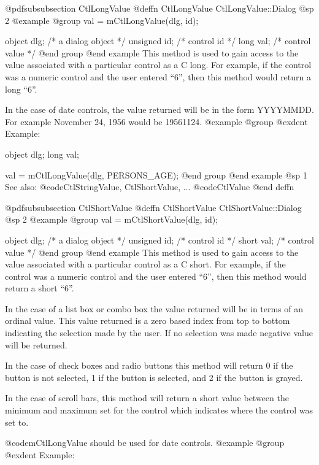 @pdfsubsubsection {CtlLongValue}
@deffn {CtlLongValue} CtlLongValue::Dialog
@sp 2
@example
@group
val = mCtlLongValue(dlg, id);

object  dlg;    /*  a dialog object  */
unsigned id;    /*  control id       */
long    val;    /*  control value    */
@end group
@end example
This method is used to gain access to the value associated with a
particular control as a C long.  For example, if the control
was a numeric control and the user entered ``6'', then this method
would return a long ``6''.

In the case of date controls, the value returned will be in the
form YYYYMMDD.  For example November 24, 1956 would be
19561124.
@example
@group
@exdent Example:

object  dlg;
long    val;

val = mCtlLongValue(dlg, PERSONS_AGE);
@end group
@end example
@sp 1
See also:  @code{CtlStringValue, CtlShortValue, ...}
        @code{CtlValue}
@end deffn














@pdfsubsubsection {CtlShortValue}
@deffn {CtlShortValue} CtlShortValue::Dialog
@sp 2
@example
@group
val = mCtlShortValue(dlg, id);

object  dlg;    /*  a dialog object  */
unsigned id;    /*  control id       */
short   val;    /*  control value    */
@end group
@end example
This method is used to gain access to the value associated with a
particular control as a C short.  For example, if the control
was a numeric control and the user entered ``6'', then this method
would return a short ``6''.

In the case of a list box or combo box the value returned will be in
terms of an ordinal value. This value returned is a zero based index
from top to bottom indicating the selection made by the user.  If no
selection was made negative value will be returned.  

In the case of check boxes and radio buttons this method will return
0 if the button is not selected, 1 if the button is selected, and
2 if the button is grayed.

In the case of scroll bars, this method will return a short value
between the minimum and maximum set for the control which indicates
where the control was set to.

@code{mCtlLongValue} should be used for date controls.
@example
@group
@exdent Example:

